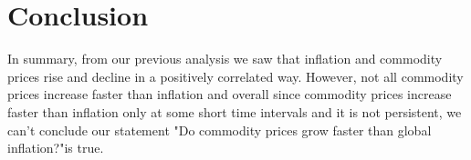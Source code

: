 \documentclass{scrartcl}
\begin{document}
\section{Conclusion}

In summary, from our previous analysis we saw that inflation and commodity prices rise and decline in a positively correlated way. However, not all commodity prices increase faster than inflation and overall since commodity prices increase faster than inflation only at some short time intervals and it is not persistent, we can't conclude our statement "Do commodity prices grow faster than global
inflation?"is true. 

\newpage
\singlespacing



\end{document}
